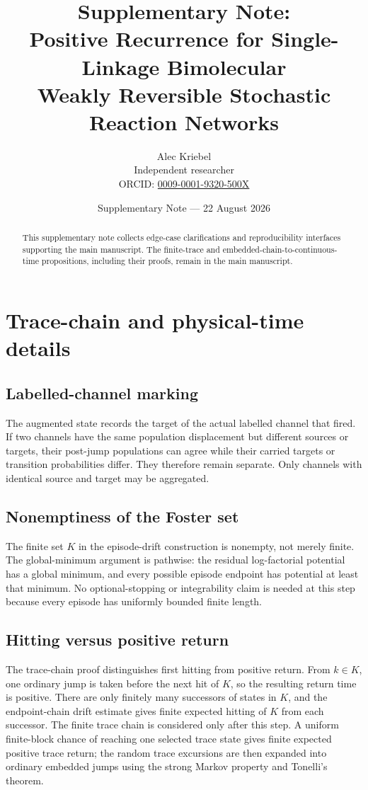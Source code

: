 \documentclass[10pt]{article}
\title{\bfseries Supplementary Note:\\[0.25em]
Positive Recurrence for Single-Linkage Bimolecular\\
Weakly Reversible Stochastic Reaction Networks}
\author{Alec Kriebel\\[0.2em]
\small Independent researcher\\
\small ORCID: \href{https://orcid.org/0009-0001-9320-500X}{0009-0001-9320-500X}}
\date{Supplementary Note --- 22 August 2026}
\begin{document}
\maketitle

\begin{abstract}
This supplementary note collects edge-case clarifications and reproducibility
interfaces supporting the main manuscript.  The finite-trace and
embedded-chain-to-continuous-time propositions, including their proofs, remain
in the main manuscript.
\end{abstract}

\section{Trace-chain and physical-time details}

\subsection{Labelled-channel marking}

The augmented state records the target of the actual labelled channel that
fired.  If two channels have the same population displacement but different
sources or targets, their post-jump populations can agree while their carried
targets or transition probabilities differ.  They therefore remain separate.
Only channels with identical source and target may be aggregated.

\subsection{Nonemptiness of the Foster set}

The finite set $K$ in the episode-drift construction is nonempty, not merely
finite.  The global-minimum argument is pathwise: the residual log-factorial
potential has a global minimum, and every possible episode endpoint has
potential at least that minimum.  No optional-stopping or integrability claim
is needed at this step because every episode has uniformly bounded finite
length.

\subsection{Hitting versus positive return}

The trace-chain proof distinguishes first hitting from positive return.  From
$k\in K$, one ordinary jump is taken before the next hit of $K$, so the
resulting return time is positive.  There are only finitely many successors of
states in $K$, and the endpoint-chain drift estimate gives finite expected
hitting of $K$ from each successor.  The finite trace chain is considered only
after this step.  A uniform finite-block chance of reaching one selected trace
state gives finite expected positive trace return; the random trace excursions
are then expanded into ordinary embedded jumps using the strong Markov
property and Tonelli's theorem.
\end{document}
